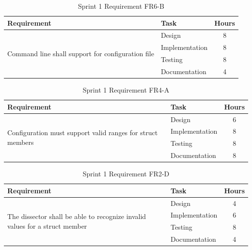 \begin{table}[!ht] \small \center
\caption{Sprint 1 Requirement FR6-B\label{tab:sp1_req7b}}
\begin{tabular}{l l c}
	\toprule
	Requirement & Task & Hours \\
	\midrule
	\multirow{4}{5cm}{Command line shall support for configuration file} & Design & 8 \\
	& Implementation & 8 \\
	& Testing & 8 \\
	& Documentation & 4 \\
	\bottomrule
\end{tabular}
\end{table}

\begin{table}[!ht] \small \center
\caption{Sprint 1 Requirement FR4-A\label{tab:sp1_req4a}}
\begin{tabular}{l l c}
	\toprule
	Requirement & Task & Hours \\
	\midrule
	\multirow{4}{5cm}{Configuration must support valid ranges for struct members} & Design & 6 \\
	& Implementation & 8 \\
	& Testing & 8 \\
	& Documentation & 8 \\
	\bottomrule
\end{tabular}
\end{table}

\begin{table}[!ht] \small \center
\caption{Sprint 1 Requirement FR2-D\label{tab:sp1_req2d}}
\begin{tabular}{l l c}
	\toprule
	Requirement & Task & Hours \\
	\midrule
	\multirow{4}{5cm}{The dissector shall be able to recognize invalid values for a struct member} & Design & 4 \\
	& Implementation & 6 \\
	& Testing & 8 \\
	& Documentation & 4 \\
	\bottomrule
\end{tabular}
\end{table}

